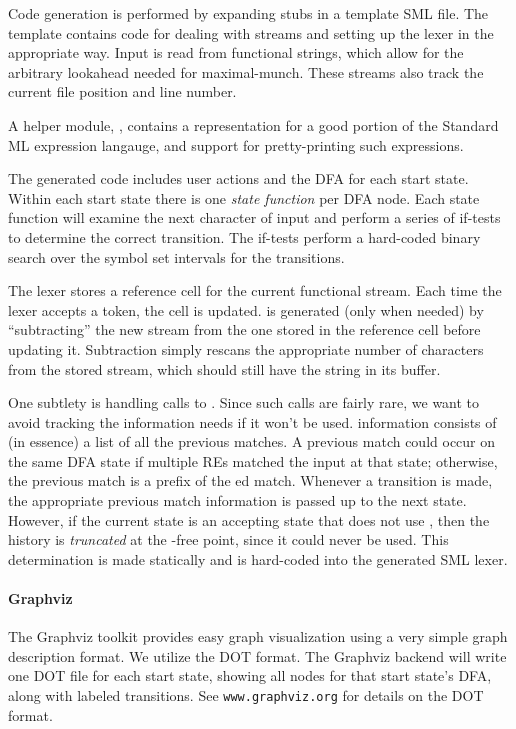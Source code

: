 Code generation is performed by expanding stubs in a template SML file.  The
template contains code for dealing with streams and setting up the lexer in the
appropriate way.  Input is read from functional strings, which allow for
the arbitrary lookahead needed for maximal-munch.  These streams also track
the current file position and line number.

A helper module, , contains a representation for a good portion of the
Standard ML expression langauge, and support for pretty-printing such
expressions.

The generated code includes user actions and the DFA for each start state.
 Within each start state there is one \emph{state function} per DFA node.  Each
state function will examine the next character of input and perform a series of
if-tests to determine the correct transition.  The if-tests perform a
hard-coded binary search over the symbol set intervals for the transitions.

The lexer stores a reference cell for the current functional stream.  Each time
the lexer accepts a token, the cell is updated.   is generated (only
when needed) by ``subtracting'' the new stream from the one stored in the
reference cell before updating it.  Subtraction simply rescans the appropriate
number of characters from the stored stream, which should still have the string
in its buffer.

One subtlety is handling calls to .  Since such calls are fairly
rare, we want to avoid tracking the information  needs if it won't
be used.   information consists of (in essence) a list of all the
previous matches.  A previous match could occur on the same DFA state if
multiple REs matched the input at that state; otherwise, the previous match is
a prefix of the ed match.  Whenever a transition is made, the
appropriate previous match information is passed up to the next state. 
However, if the current state is an accepting state that does not use
, then the history is \emph{truncated} at the -free
point, since it could never be used.  This determination is made statically and
is hard-coded into the generated SML lexer.

\paragraph{Graphviz}

The Graphviz toolkit provides easy graph visualization using a very simple
graph description format.  We utilize the DOT format.  The Graphviz backend
will write one DOT file for each start state, showing all nodes for that start
state's DFA, along with labeled transitions.  See \texttt{www.graphviz.org} for
details on the DOT format.

